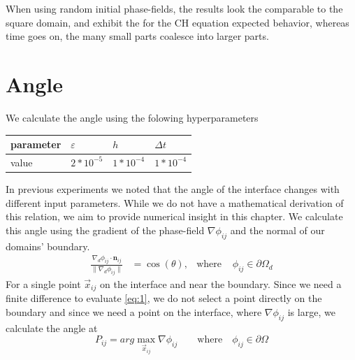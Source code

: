 \documentclass{mimosis}
\begin{document}
When using random initial phase-fields, the results look the comparable to the square domain, and exhibit the for the CH equation expected behavior, whereas time goes on, the many small parts coalesce into larger parts.
\chapter{Angle}
\label{sec:org87a873f}
We calculate the angle using the folowing hyperparameters
\begin{center}
\begin{tabular}{llll}
parameter & \(\varepsilon\) & \(h\) & \(\Delta t\)\\
\hline
value & \(2 * 10^{-5}\) & \(1*10^{-4}\) & \(1*10^{-4}\)\\
\end{tabular}
\end{center}
In previous experiments we noted that the angle of the interface changes with different input parameters. While we do not have a mathematical derivation of this relation, we aim to provide numerical insight in this chapter. We calculate this angle using the gradient of the phase-field \(\nabla \phi_{ij}\) and the normal of our domains' boundary.
\begin{align}
\label{eq:1}
\frac{\nabla_d \phi_{ij} \cdot \mathbf{n}_{ij}}{\|\nabla_{d} \phi_{ij}\|} &= \cos(\theta),& \text{where}\,&\, \phi_{ij} \in \partial\Omega_{d}
\end{align}
For a single point \(\vec{x}_{ij}\) on the interface and near the boundary. Since we need a finite difference to evaluate \eqref{eq:1}, we do not select a point directly on the boundary and since we need a point on the interface, where \(\nabla \phi_{ij}\) is large, we calculate the angle at
\begin{equation}
\label{eq:2}
P_{ij} = arg\max_{\vec{x}_{ij}} \nabla \phi_{ij} \qquad \text{where} \quad \phi_{ij} \in \partial \Omega
\end{equation}
\end{document}
